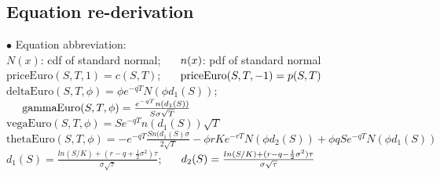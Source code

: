 \documentclass[preprint,12pt,1p]{elsarticle}
\begin{document}
\subsection{Equation re-derivation}
$\bullet$ Equation abbreviation: \\[6pt]
$N(x)$: cdf of standard normal; $\hspace{0.5cm} n(x)$: pdf of standard normal\\ [6pt]
$\text{priceEuro}(S, T, 1) = c(S, T)$; $\hspace{0.5cm}\text{priceEuro}(S, T, -1) = p(S, T)$\\[6pt]
$\text{deltaEuro}(S, T, \phi) = \phi  e^{-qT} N(\phi d_1(S))$; $\hspace{0.5cm}\text{gammaEuro}(S, T, \phi) = \frac{e^{-qT}n(d_1(S))}{S\sigma\sqrt{T}}$\\[6pt]
$\text{vegaEuro}(S,T,\phi) = S e^{-qT}n(d_1(S))\sqrt{T}$\\[6pt]
$\text{thetaEuro}(S,T,\phi) = -e^{-qT}\frac{Sn(d_1(S)\sigma}{2\sqrt{T}} - \phi rKe^{-rT}N(\phi d_2(S)) + \phi qSe^{-qT} N(\phi d_1(S))$ \\[6pt]
$d_1(S) = \frac{ln(S/K) + (r-q+\frac{1}{2}\sigma^2)\tau}{\sigma \sqrt{\tau}}$; $\hspace{0.5cm} d_2(S) = \frac{ln(S/K) + (r-q-\frac{1}{2}\sigma^2)\tau}{\sigma \sqrt{\tau}}$\\[6pt]
\end{document}
